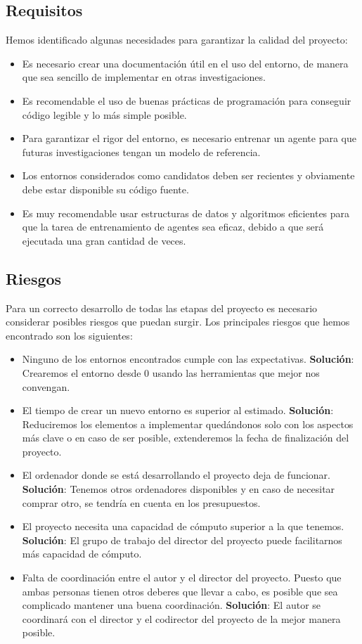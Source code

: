  \subsection{Requisitos}

Hemos identificado algunas necesidades para garantizar la calidad del proyecto:
\begin{itemize}
    \item Es necesario crear una documentación útil en el uso del entorno, de manera que sea sencillo de implementar en otras investigaciones.
    \item Es recomendable el uso de buenas prácticas de programación para conseguir código legible y lo más simple posible. 
    \item Para garantizar el rigor del entorno, es necesario entrenar un agente para que futuras investigaciones tengan un modelo de referencia.
    \item Los entornos considerados como candidatos deben ser recientes y obviamente debe estar disponible su código fuente. 
    \item Es muy recomendable usar estructuras de datos y algoritmos eficientes para que la tarea de entrenamiento de agentes sea eficaz, debido a que será ejecutada una gran cantidad de veces.
\end{itemize}


\subsection{Riesgos}
Para un correcto desarrollo de todas las etapas del proyecto es necesario considerar posibles riesgos que puedan surgir. Los principales riesgos que hemos encontrado son los siguientes:
\begin{itemize}
    \item Ninguno de los entornos encontrados cumple con las expectativas. \textbf{Solución}: Crearemos el entorno desde 0 usando las herramientas que mejor nos convengan.
    \item El tiempo de crear un nuevo entorno es superior al estimado. \textbf{Solución}: Reduciremos los elementos a implementar quedándonos solo con los aspectos más clave o en caso de ser posible, extenderemos la fecha de finalización del proyecto.
    \item El ordenador donde se está desarrollando el proyecto deja de funcionar. \textbf{Solución}: Tenemos otros ordenadores disponibles y en caso de necesitar comprar otro, se tendría en cuenta en los presupuestos. 
    \item El proyecto necesita una capacidad de cómputo superior a la que tenemos. \textbf{Solución}: El grupo de trabajo del director del proyecto puede facilitarnos más capacidad de cómputo.
    \item Falta de coordinación entre el autor y el director del proyecto. Puesto que ambas personas tienen otros deberes que llevar a cabo, es posible que sea complicado mantener una buena coordinación. \textbf{Solución}: El autor se coordinará con el director y el codirector del proyecto de la mejor manera posible. 
\end{itemize}
    